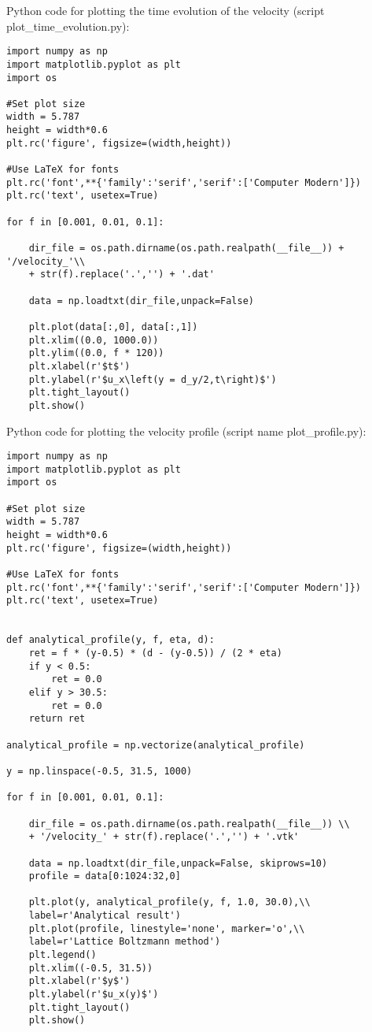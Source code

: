\documentclass[a4paper,10pt,bibtotoc]{scrartcl}
\begin{document}
Python code for plotting the time evolution of the velocity (script plot\_time\_evolution.py):
\begin{lstlisting}
import numpy as np
import matplotlib.pyplot as plt
import os

#Set plot size
width = 5.787
height = width*0.6
plt.rc('figure', figsize=(width,height))

#Use LaTeX for fonts
plt.rc('font',**{'family':'serif','serif':['Computer Modern']})
plt.rc('text', usetex=True)

for f in [0.001, 0.01, 0.1]:

    dir_file = os.path.dirname(os.path.realpath(__file__)) + '/velocity_'\\
    + str(f).replace('.','') + '.dat'

    data = np.loadtxt(dir_file,unpack=False)

    plt.plot(data[:,0], data[:,1])
    plt.xlim((0.0, 1000.0))
    plt.ylim((0.0, f * 120))
    plt.xlabel(r'$t$')
    plt.ylabel(r'$u_x\left(y = d_y/2,t\right)$')
    plt.tight_layout()
    plt.show()
\end{lstlisting}
Python code for plotting the velocity profile (script name plot\_profile.py):
\begin{lstlisting}
import numpy as np
import matplotlib.pyplot as plt
import os

#Set plot size
width = 5.787
height = width*0.6
plt.rc('figure', figsize=(width,height))

#Use LaTeX for fonts
plt.rc('font',**{'family':'serif','serif':['Computer Modern']})
plt.rc('text', usetex=True)


def analytical_profile(y, f, eta, d):
    ret = f * (y-0.5) * (d - (y-0.5)) / (2 * eta)
    if y < 0.5:
        ret = 0.0
    elif y > 30.5:
        ret = 0.0
    return ret

analytical_profile = np.vectorize(analytical_profile)

y = np.linspace(-0.5, 31.5, 1000)

for f in [0.001, 0.01, 0.1]:

    dir_file = os.path.dirname(os.path.realpath(__file__)) \\
    + '/velocity_' + str(f).replace('.','') + '.vtk'

    data = np.loadtxt(dir_file,unpack=False, skiprows=10)
    profile = data[0:1024:32,0]

    plt.plot(y, analytical_profile(y, f, 1.0, 30.0),\\
    label=r'Analytical result')
    plt.plot(profile, linestyle='none', marker='o',\\
    label=r'Lattice Boltzmann method')
    plt.legend()
    plt.xlim((-0.5, 31.5))
    plt.xlabel(r'$y$')
    plt.ylabel(r'$u_x(y)$')
    plt.tight_layout()
    plt.show()
\end{lstlisting}
\end{document}
